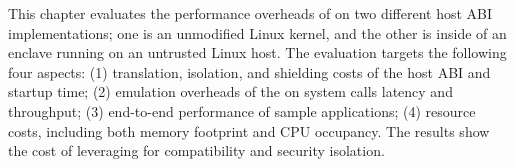 This chapter evaluates the performance overheads of \graphene{}
on two different host ABI implementations;
one is an unmodified Linux kernel, and the other is inside of an \sgx{} enclave running on an untrusted Linux host.
The evaluation
targets the following four aspects:
(1) translation, isolation, and shielding costs of the host ABI and startup time;
(2) emulation overheads of the \libos{} on system calls latency and throughput;
(3) end-to-end performance of sample applications;
(4) resource costs, including both memory footprint and CPU occupancy.
The results
show the cost of leveraging \graphene{} for compatibility and security isolation.










